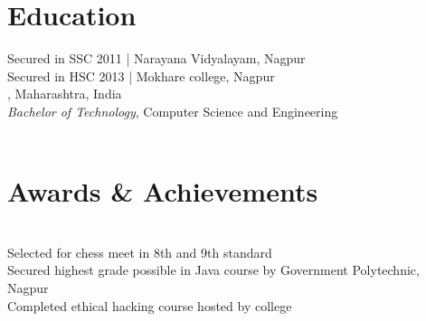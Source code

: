 \documentclass[mm]{simple_style}
\begin{document}
\address{Plot no-215\\Jai Durga Society No-1\\Narendra Nagar\\Nagpur, Maharashtra, India}

\begin{resume}

\section{Education}
Secured   in SSC 2011 | Narayana Vidyalayam, Nagpur\\
Secured   in HSC 2013 | Mokhare college, Nagpur\\
, Maharashtra, India\\
{\sl Bachelor of Technology}, Computer Science and Engineering\\
\\
\sectionline


\section{Awards \& Achievements}
\\
Selected for  chess meet in 8th and 9th standard\\
Secured highest grade possible in Java course by Government Polytechnic, Nagpur\\
Completed ethical hacking course hosted by college\\


\end{resume}
\end{document}
